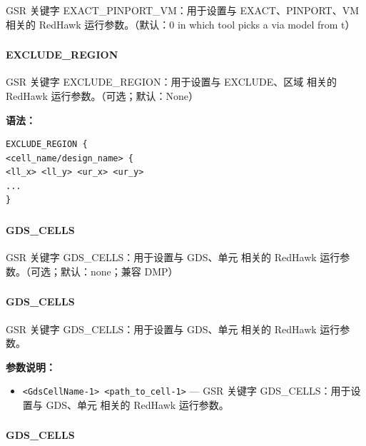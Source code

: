 GSR 关键字 EXACT_PINPORT_VM：用于设置与 EXACT、PINPORT、VM 相关的 RedHawk 运行参数。（默认：0 in which tool picks a via model from t）

\subsubsection{}
\paragraph*{EXCLUDE_REGION}

GSR 关键字 EXCLUDE_REGION：用于设置与 EXCLUDE、区域 相关的 RedHawk 运行参数。（可选；默认：None）

\textbf{语法：}
\begin{lstlisting}
EXCLUDE_REGION {
<cell_name/design_name> {
<ll_x> <ll_y> <ur_x> <ur_y>
...
}
\end{lstlisting}

\subsubsection{}
\paragraph*{GDS_CELLS}

GSR 关键字 GDS_CELLS：用于设置与 GDS、单元 相关的 RedHawk 运行参数。（可选；默认：none；兼容 DMP）

\subsubsection{}
\paragraph*{GDS_CELLS}

GSR 关键字 GDS_CELLS：用于设置与 GDS、单元 相关的 RedHawk 运行参数。

\textbf{参数说明：}
\begin{itemize}
\item \texttt{<GdsCellName-1> <path\_to\_cell-1>} — GSR 关键字 GDS\_CELLS：用于设置与 GDS、单元 相关的 RedHawk 运行参数。
\end{itemize}

\subsubsection{}
\paragraph*{GDS_CELLS}

